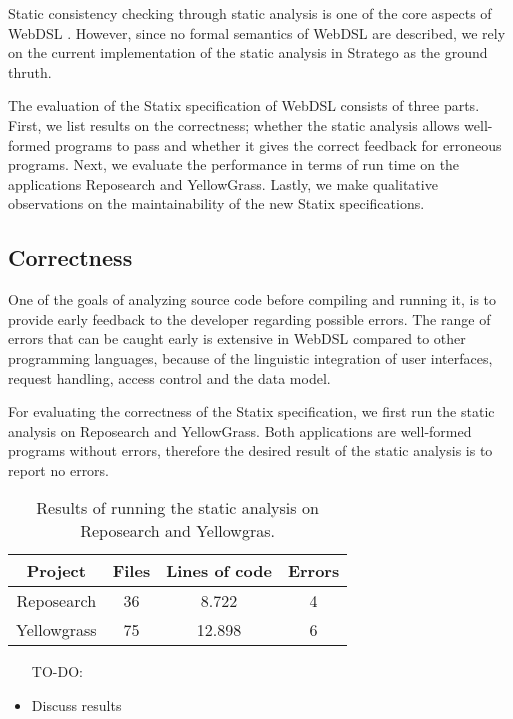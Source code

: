   Static consistency checking through static analysis is one of the core aspects of WebDSL \autocite{Hemel2011}. However, since no formal semantics of WebDSL are described, we rely on the current implementation of the static analysis in Stratego as the ground thruth.
  
  The evaluation of the Statix specification of WebDSL consists of three parts. First, we list results on the correctness; whether the static analysis allows well-formed programs to pass and whether it gives the correct feedback for erroneous programs. Next, we evaluate the performance in terms of run time on the applications Reposearch and YellowGrass. Lastly, we make qualitative observations on the maintainability of the new Statix specifications.

  \subsection{Correctness}

    One of the goals of analyzing source code before compiling and running it, is to provide early feedback to the developer regarding possible errors. The range of errors that can be caught early is extensive in WebDSL compared to other programming languages, because of the linguistic integration of user interfaces, request handling, access control and the data model.

    For evaluating the correctness of the Statix specification, we first run the static analysis on Reposearch and YellowGrass. Both applications are well-formed programs without errors, therefore the desired result of the static analysis is to report no errors.

    \begin{table}[h]
      \centering
      \begin{tabular}{ | c || c | c | c | }
        \hline
        Project & Files & Lines of code & Errors \\
        \hline
        Reposearch & 36 & 8.722 & 4 \\
        \hline
        Yellowgrass & 75 & 12.898 & 6 \\
        \hline
      \end{tabular}
      \caption{\label{tbl:statix-reposearch-yellowgrass-results}Results of running the static analysis on Reposearch and Yellowgras.}
    \end{table}

    \begin{itemize}
      \item[TO-DO:]
      \item Discuss results
    \end{itemize}

